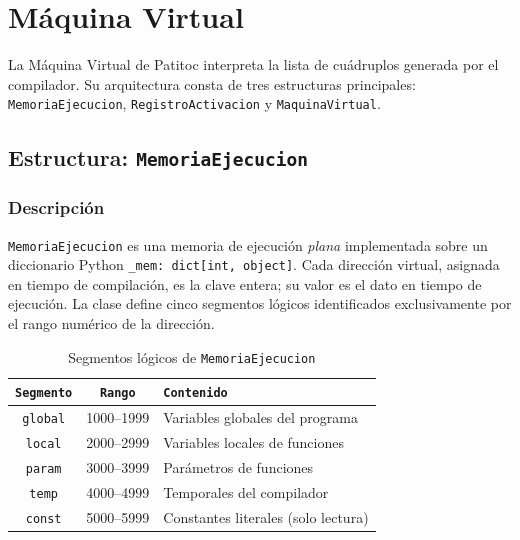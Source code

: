 \documentclass[12pt, letterpaper]{article}
\theoremstyle{definition}
\begin{document}
\section{Máquina Virtual}

La Máquina Virtual de Patitoc interpreta la lista de cuádruplos generada por el compilador. Su arquitectura consta de tres estructuras principales: \texttt{MemoriaEjecucion}, \texttt{RegistroActivacion} y \texttt{MaquinaVirtual}.

\subsection{Estructura: \texttt{MemoriaEjecucion}}

\subsubsection*{Descripción}

\texttt{MemoriaEjecucion} es una memoria de ejecución \emph{plana} implementada sobre un diccionario Python \texttt{\_mem: dict[int, object]}. Cada dirección virtual, asignada en tiempo de compilación, es la clave entera; su valor es el dato en tiempo de ejecución. La clase define cinco segmentos lógicos identificados exclusivamente por el rango numérico de la dirección.

\begin{table}[H]
\centering
\caption{Segmentos lógicos de \texttt{MemoriaEjecucion}}
\label{tab:segmentos-mem}
\begin{tabular}{|c|c|l|}
    \hline
    \texttt{Segmento} & \texttt{Rango} & \texttt{Contenido} \\ \hline
    \texttt{global} & 1000--1999 & Variables globales del programa \\ \hline
    \texttt{local}  & 2000--2999 & Variables locales de funciones  \\ \hline
    \texttt{param}  & 3000--3999 & Parámetros de funciones         \\ \hline
    \texttt{temp}   & 4000--4999 & Temporales del compilador       \\ \hline
    \texttt{const}  & 5000--5999 & Constantes literales (solo lectura) \\ \hline
\end{tabular}
\end{table}
\end{document}
